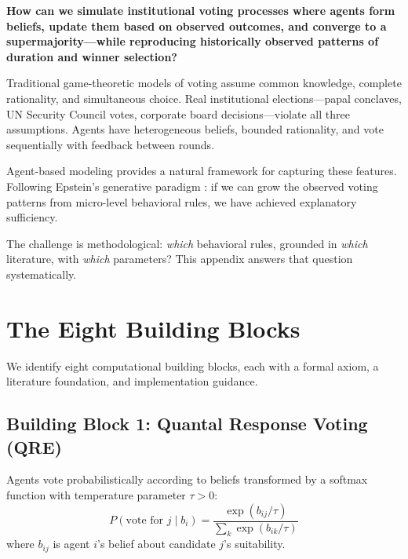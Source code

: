 \begin{tcolorbox}[colback=red!5!white, colframe=red!75!black, title=Fundamental Question]
\textbf{How can we simulate institutional voting processes where agents form beliefs,
update them based on observed outcomes, and converge to a supermajority---while
reproducing historically observed patterns of duration and winner selection?}
\end{tcolorbox}

Traditional game-theoretic models of voting assume common knowledge, complete
rationality, and simultaneous choice. Real institutional elections---papal
conclaves, UN Security Council votes, corporate board decisions---violate all
three assumptions. Agents have heterogeneous beliefs, bounded rationality, and
vote sequentially with feedback between rounds.

Agent-based modeling provides a natural framework for capturing these features.
Following Epstein's generative paradigm \citep{epstein2006generative}: if we can
grow the observed voting patterns from micro-level behavioral rules, we have
achieved explanatory sufficiency.

The challenge is methodological: \emph{which} behavioral rules, grounded in
\emph{which} literature, with \emph{which} parameters? This appendix answers
that question systematically.


\section{The Eight Building Blocks}
\label{sec:bp-blocks}

We identify eight computational building blocks, each with a formal axiom,
a literature foundation, and implementation guidance.


\subsection{Building Block 1: Quantal Response Voting (QRE)}
\label{sec:bp-qre}

\begin{tcolorbox}[colback=blue!3!white, colframe=blue!60!black, title=Axiom VTM-1: Quantal Response]
Agents vote probabilistically according to beliefs transformed by a softmax
function with temperature parameter $\tau > 0$:
\begin{equation}
P(\text{vote for } j \mid b_i) = \frac{\exp(b_{ij} / \tau)}{\sum_k \exp(b_{ik} / \tau)}
\label{eq:qre}
\end{equation}
where $b_{ij}$ is agent $i$'s belief about candidate $j$'s suitability.
\end{tcolorbox}


